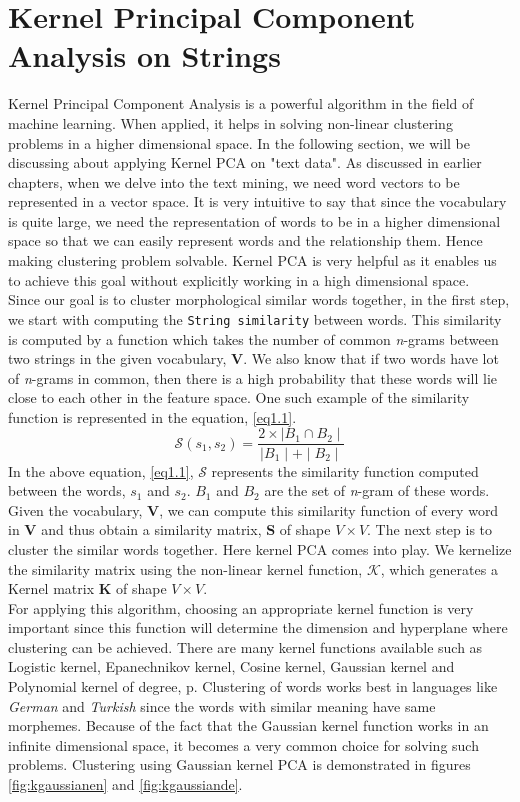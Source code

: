 \section{Kernel Principal Component Analysis on Strings}\label{secKPCA}
Kernel Principal Component Analysis is a powerful algorithm in the field of machine learning. When applied, it helps in solving non-linear clustering problems in a higher dimensional space. In the following section, we will be discussing about applying Kernel PCA on "text data". As discussed in earlier chapters, when we delve into the text mining, we need word vectors to be represented in a vector space. It is very intuitive to say that since the vocabulary is quite large, we need the representation of words to be in a higher dimensional space so that we can easily represent words and the relationship them. Hence making clustering problem solvable. Kernel PCA is very helpful as it enables us to achieve this goal without explicitly working in a high dimensional space.\\
Since our goal is to cluster morphological similar words together, in the first step, we start with computing the \texttt{String similarity} between words. This similarity is computed by a function which takes the number of common \textit{n}-grams between two strings in the given vocabulary, $\mathbf{V}$. We also know that if two words have lot of \textit{n}-grams in common, then there is a high probability that these words will lie close to each other in the feature space. One such example of the similarity function is represented in the equation, \ref{eq1.1}.
 \begin{equation}\label{eq1.1}
 \mathcal{S}(s_1,s_2) = \frac{2\times\mid B_1\cap B_2\mid}{\mid B_1 \mid + \mid B_2 \mid}
 \end{equation}
 In the above equation, \ref{eq1.1}, $\mathcal{S}$ represents the similarity function computed between the words, $s_1$ and $s_2$. $B_1$ and $B_2$ are the set of \textit{n}-gram of these words. Given the vocabulary, $\mathbf{V}$, we can compute this similarity function of every word in $\mathbf{V}$ and thus obtain a similarity matrix, $\mathbf{S}$ of shape $V\times V$.
 The next step is to cluster the similar words together. Here kernel PCA comes into play. We kernelize the similarity matrix using the non-linear kernel function, $\mathcal{K}$, which generates a Kernel matrix $\mathbf{K}$ of shape $V\times V$.\\
  For applying this algorithm, choosing an appropriate kernel function is very important since this function will determine the dimension and hyperplane where clustering can be achieved. There are many kernel functions available such as Logistic kernel,  Epanechnikov kernel, Cosine kernel, Gaussian kernel and Polynomial kernel of degree, p. Clustering of words works best in languages like \textit{German} and \textit{Turkish} since the words with similar meaning have same morphemes. Because of the fact that the Gaussian kernel function works in an infinite dimensional space, it becomes a very common choice for solving such problems. Clustering using Gaussian kernel PCA is demonstrated in figures \ref{fig:kgaussianen} and \ref{fig:kgaussiande}.\\

